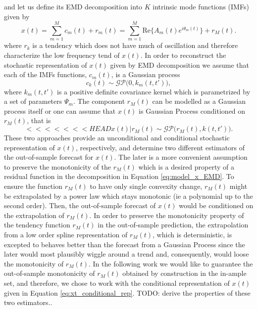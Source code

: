 and let us define its EMD decomposition into $K$ intrinsic mode functions (IMFs) given by 
\begin{equation}\label{eq:model_x_EMD}
x(t) = \sum_{m = 1}^M c_m(t) + r_m(t) = \sum_{m = 1}^M \text{Re}\Big\{ A_m(t)  e^{i \theta_m(t)} \Big\} + r_M(t).
\end{equation}
where $r_k$ is a tendency which does not have much of oscillation and therefore characterize the low frequency tend of $x(t)$. In order to reconstruct the stochastic representation of $x(t)$ given by EMD decomposition we assume that each of the IMFs functions, $c_m(t)$, is a Gaussian process 
\begin{equation}\label{eq:model_IMF_GP_k}
c_k(t) \sim \mathcal{GP} \Big(0, k_m(t,t')\Big), 
\end{equation}
where $k_m(t,t')$ is a positive definite covariance kernel which is parametrized by a set of parameters $\Psi_m$.   The component $r_M(t)$ can be modelled as a Gaussian process itself or one can assume that $x(t)$ is Gaussian Process conditioned on $r_M(t)$, that is
\begin{equation}\label{eq:xt_conditional_rep}
<<<<<<< HEAD
x(t) | r_M(t) \sim \mathcal{GP} \Big(r_M(t),  k(t,t')  \Big).
\end{equation}
These two approaches provide an unconditional and conditional stochastic representation of $x(t)$, respectively, and determine two different estimators of the out-of-sample forecast for $x(t)$.  The later is a more convenient assumption to preserve the monotonicity of the $r_M(t)$ which is a desired property of a residual function in the decomposition in Equation \eqref{eq:model_x_EMD}.  To ensure the function $r_M(t)$ to have only single convexity change, $r_M(t)$ might be extrapolated by a power law which stays monotonic (ie a polynomial up to the second order). Then, the out-of-sample forecast of $x(t)$ would be conditioned on the extrapolation of $r_M(t)$.  In order to preserve the monotonicity property of the tendency function $r_M(t)$ in the out-of-sample prediction, the extrapolation from a low order spline representation of $r_M(t)$, which is deterministic,  is excepted to behaves better than the forecast from a Gaussian Process since the later would most plausibly wiggle around a trend and, consequently, would loose the monotonicity of $r_M(t)$.  In the following work we would like to guarantee the out-of-sample monotonicity of $r_M(t)$ obtained by construction in the in-ample set,  and therefore, we chose to work with the conditional representation of $x(t)$ given in Equation \eqref{eq:xt_conditional_rep}.  {\color{red} TODO: derive the properties of these two estimators.}.

